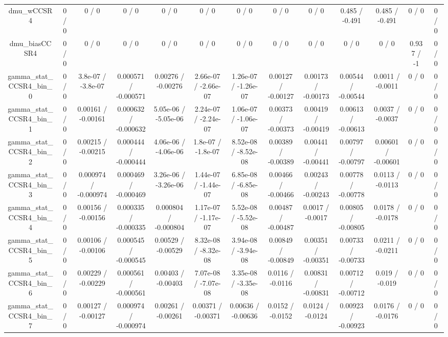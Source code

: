 \documentclass[10pt]{article}
\begin{document}
\begin{table}[htbp]
\begin{center}
\begin{tabular}{|c|c|c|c|c|c|c|c|c|c|c|c|c|}
  dmu_wCCSR4 & 0 / 0 & 0 / 0 & 0 / 0 & 0 / 0 & 0 / 0 & 0 / 0 & 0 / 0 & 0 / 0 & 0.485 / -0.491 & 0.485 / -0.491 & 0 / 0 & 0 / 0 \\ 
  dmu_biasCCSR4 & 0 / 0 & 0 / 0 & 0 / 0 & 0 / 0 & 0 / 0 & 0 / 0 & 0 / 0 & 0 / 0 & 0 / 0 & 0 / 0 & 0.937 / -1 & 0 / 0 \\ 
  gamma_stat_CCSR4_bin_0 & 0 / 0 & 3.8e-07 / -3.8e-07 & 0.000571 / -0.000571 & 0.00276 / -0.00276 & 2.66e-07 / -2.66e-07 & 1.26e-07 / -1.26e-07 & 0.00127 / -0.00127 & 0.00173 / -0.00173 & 0.00544 / -0.00544 & 0.0011 / -0.0011 & 0 / 0 & 0 / 0 \\ 
  gamma_stat_CCSR4_bin_1 & 0 / 0 & 0.00161 / -0.00161 & 0.000632 / -0.000632 & 5.05e-06 / -5.05e-06 & 2.24e-07 / -2.24e-07 & 1.06e-07 / -1.06e-07 & 0.00373 / -0.00373 & 0.00419 / -0.00419 & 0.00613 / -0.00613 & 0.0037 / -0.0037 & 0 / 0 & 0 / 0 \\ 
  gamma_stat_CCSR4_bin_2 & 0 / 0 & 0.00215 / -0.00215 & 0.000444 / -0.000444 & 4.06e-06 / -4.06e-06 & 1.8e-07 / -1.8e-07 & 8.52e-08 / -8.52e-08 & 0.00389 / -0.00389 & 0.00441 / -0.00441 & 0.00797 / -0.00797 & 0.00601 / -0.00601 & 0 / 0 & 0 / 0 \\ 
  gamma_stat_CCSR4_bin_3 & 0 / 0 & 0.000974 / -0.000974 & 0.000469 / -0.000469 & 3.26e-06 / -3.26e-06 & 1.44e-07 / -1.44e-07 & 6.85e-08 / -6.85e-08 & 0.00466 / -0.00466 & 0.00243 / -0.00243 & 0.00778 / -0.00778 & 0.0113 / -0.0113 & 0 / 0 & 0 / 0 \\ 
  gamma_stat_CCSR4_bin_4 & 0 / 0 & 0.00156 / -0.00156 & 0.000335 / -0.000335 & 0.000804 / -0.000804 & 1.17e-07 / -1.17e-07 & 5.52e-08 / -5.52e-08 & 0.00487 / -0.00487 & 0.0017 / -0.0017 & 0.00805 / -0.00805 & 0.0178 / -0.0178 & 0 / 0 & 0 / 0 \\ 
  gamma_stat_CCSR4_bin_5 & 0 / 0 & 0.00106 / -0.00106 & 0.000545 / -0.000545 & 0.00529 / -0.00529 & 8.32e-08 / -8.32e-08 & 3.94e-08 / -3.94e-08 & 0.00849 / -0.00849 & 0.00351 / -0.00351 & 0.00733 / -0.00733 & 0.0211 / -0.0211 & 0 / 0 & 0 / 0 \\ 
  gamma_stat_CCSR4_bin_6 & 0 / 0 & 0.00229 / -0.00229 & 0.000561 / -0.000561 & 0.00403 / -0.00403 & 7.07e-08 / -7.07e-08 & 3.35e-08 / -3.35e-08 & 0.0116 / -0.0116 & 0.00831 / -0.00831 & 0.00712 / -0.00712 & 0.019 / -0.019 & 0 / 0 & 0 / 0 \\ 
  gamma_stat_CCSR4_bin_7 & 0 / 0 & 0.00127 / -0.00127 & 0.000974 / -0.000974 & 0.00261 / -0.00261 & 0.00371 / -0.00371 & 0.00636 / -0.00636 & 0.0152 / -0.0152 & 0.0124 / -0.0124 & 0.00923 / -0.00923 & 0.0176 / -0.0176 & 0 / 0 & 0 / 0 \\ 

\end{tabular}
\end{center}
\end{table}
\end{document}
